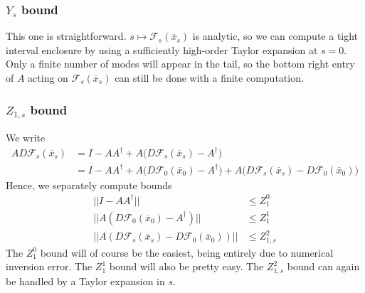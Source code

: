 \documentclass[10pt]{article}
\begin{document}
\subsubsection{$Y_s$ bound}
This one is straightforward. $s\mapsto\mathcal{F}_s(\overline x_s)$ is analytic, so we can compute a tight interval enclosure by using a sufficiently high-order Taylor expansion at $s=0$. Only a finite number of modes will appear in the tail, so the bottom right entry of $A$ acting on $\mathcal{F}_s(\overline x_s)$ can still be done with a finite computation.

\subsubsection{$Z_{1,s}$ bound}
We write
\begin{align*}
AD\mathcal{F}_s(\overline x_s) & = I-AA^\dagger + A\big(D\mathcal{F}_s(\overline x_s)-A^\dagger\big)\\
&=I-AA^\dagger + A\big(D\mathcal{F}_0(\overline x_0) - A^\dagger \big) + A\big(D\mathcal{F}_s(\overline x_s)-D\mathcal{F}_0(\overline x_0) \big)
\end{align*}
Hence, we separately compute bounds
\begin{align*}
||I-AA^\dagger||&\leq Z_1^0\\
||A(D\mathcal{F}_0(\overline x_0)-A^\dagger)||&\leq Z_1^1\\
||A(D\mathcal{F}_s(\overline x_s)-D\mathcal{F}_0(\overline x_0))||&\leq Z_{1,s}^2
\end{align*}
The $Z_1^0$ bound will of course be the easiest, being entirely due to numerical inversion error. The $Z_1^1$ bound will also be pretty easy. The $Z_{1,s}^2$ bound can again be handled by a Taylor expansion in $s$.
\end{document}
